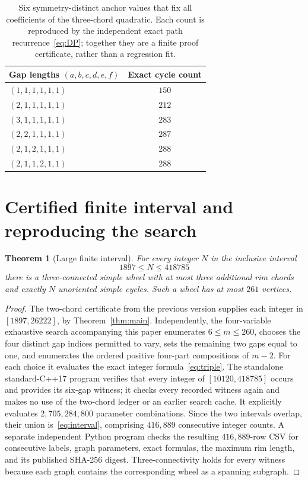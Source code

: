 \documentclass[9pt,a4paper,twocolumn]{extarticle}
\newtheorem{theorem}{Theorem}
\begin{document}
\begin{table}[t]
\centering\small
\caption{Six symmetry-distinct anchor values that fix all coefficients of the three-chord quadratic. Each count is reproduced by the independent exact path recurrence~\eqref{eq:DP}; together they are a finite proof certificate, rather than a regression fit.}\label{tab:anchors}
\begin{tabular}{@{}lc@{}}
\toprule
Gap lengths $(a,b,c,d,e,f)$ & Exact cycle count\\
\midrule
$(1,1,1,1,1,1)$ & $150$\\
$(2,1,1,1,1,1)$ & $212$\\
$(3,1,1,1,1,1)$ & $283$\\
$(2,2,1,1,1,1)$ & $287$\\
$(2,1,2,1,1,1)$ & $288$\\
$(2,1,1,2,1,1)$ & $288$\\
\bottomrule
\end{tabular}
\end{table}

\section{Certified finite interval and reproducing the search}
\begin{theorem}[Large finite interval]\label{thm:interval}
For every integer $N$ in the inclusive interval
\begin{equation}\label{eq:interval}
\boxed{1897\le N\le 418785}
\end{equation}
there is a three-connected simple wheel with at most three additional rim chords and exactly $N$ unoriented simple cycles. Such a wheel has at most $261$ vertices.\end{theorem}
\begin{proof}
The two-chord certificate from the previous version supplies each integer in $[1897,26222]$, by Theorem~\ref{thm:main}. Independently, the four-variable exhaustive search accompanying this paper enumerates $6\le m\le260$, chooses the four distinct gap indices permitted to vary, sets the remaining two gaps equal to one, and enumerates the ordered positive four-part compositions of $m-2$. For each choice it evaluates the exact integer formula~\eqref{eq:triple}. The standalone standard-C++17 program verifies that every integer of $[10120,418785]$ occurs and provides its six-gap witness; it checks every recorded witness again and makes no use of the two-chord ledger or an earlier search cache. It explicitly evaluates $2{,}705{,}284{,}800$ parameter combinations. Since the two intervals overlap, their union is~\eqref{eq:interval}, comprising $416{,}889$ consecutive integer counts. A separate independent Python program checks the resulting $416{,}889$-row CSV for consecutive labels, graph parameters, exact formulas, the maximum rim length, and its published SHA-256 digest. Three-connectivity holds for every witness because each graph contains the corresponding wheel as a spanning subgraph.\end{proof}
\end{document}
